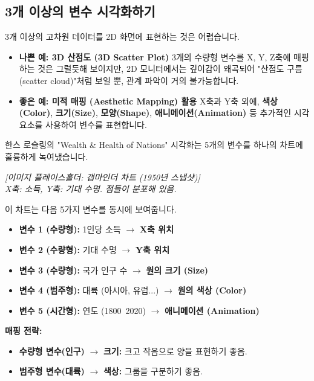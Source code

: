 \documentclass[11pt,a4paper]{book}
\theoremstyle{definition}
\begin{document}
\subsection{3개 이상의 변수 시각화하기}

3개 이상의 고차원 데이터를 2D 화면에 표현하는 것은 어렵습니다.

\begin{itemize}
    \item \textbf{나쁜 예: 3D 산점도 (3D Scatter Plot)}
    3개의 수량형 변수를 X, Y, Z축에 매핑하는 것은 그럴듯해 보이지만, 2D 모니터에서는 깊이감이 왜곡되어 "산점도 구름(scatter cloud)"처럼 보일 뿐, 관계 파악이 거의 불가능합니다.

    \item \textbf{좋은 예: 미적 매핑 (Aesthetic Mapping) 활용}
    X축과 Y축 외에, \textbf{색상(Color)}, \textbf{크기(Size)}, \textbf{모양(Shape)}, \textbf{애니메이션(Animation)} 등 추가적인 시각 요소를 사용하여 변수를 표현합니다.
\end{itemize}

\begin{examplebox}[title={사례 연구: 갭마인더(Gapminder)의 5변수 시각화}]
한스 로슬링의 "Wealth \& Health of Nations" 시각화는 5개의 변수를 하나의 차트에 훌륭하게 녹여냈습니다.

\begin{center}
    \textit{[이미지 플레이스홀더: 갭마인더 차트 (1950년 스냅샷)]} \\
    \textit{X축: 소득, Y축: 기대 수명. 점들이 분포해 있음.}
\end{center}

이 차트는 다음 5가지 변수를 동시에 보여줍니다.
\begin{itemize}
    \item \textbf{변수 1 (수량형):} 1인당 소득 $\rightarrow$ \textbf{X축 위치}
    \item \textbf{변수 2 (수량형):} 기대 수명 $\rightarrow$ \textbf{Y축 위치}
    \item \textbf{변수 3 (수량형):} 국가 인구 수 $\rightarrow$ \textbf{원의 크기 (Size)}
    \item \textbf{변수 4 (범주형):} 대륙 (아시아, 유럽...) $\rightarrow$ \textbf{원의 색상 (Color)}
    \item \textbf{변수 5 (시간형):} 연도 (1800~2020) $\rightarrow$ \textbf{애니메이션 (Animation)}
\end{itemize}

\textbf{매핑 전략:}
\begin{itemize}
    \item \textbf{수량형 변수(인구)} $\rightarrow$ \textbf{크기:} 크고 작음으로 양을 표현하기 좋음.
    \item \textbf{범주형 변수(대륙)} $\rightarrow$ \textbf{색상:} 그룹을 구분하기 좋음.
\end{itemize}
\end{examplebox}
\end{document}
